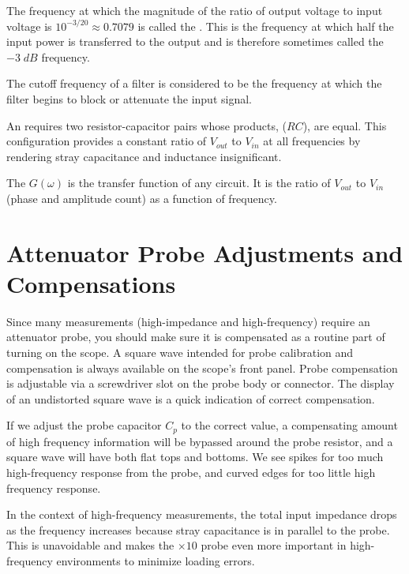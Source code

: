 \documentclass[12pt, a4paper, oneside, openright, titlepage]{book}
\begin{document}
\begin{defn}
    The frequency at which the magnitude of the ratio of output voltage to input voltage is $10^{-3/20}\approx 0.7079$ is called the . This is the frequency at which half the input power is transferred to the output and is therefore sometimes called the $-3\;dB$ frequency.
\end{defn}

The cutoff frequency of a filter is considered to be the frequency at which the filter begins to block or attenuate the input signal.

\begin{defn}
    An  requires two resistor-capacitor pairs whose products, ($RC$), are equal. This configuration provides a constant ratio of $V_{out}$ to $V_{in}$ at all frequencies by rendering stray capacitance and inductance insignificant.
\end{defn}

\begin{defn}
    The  $G(\omega)$ is the transfer function of any circuit. It is the ratio of $V_{out}$ to $V_{in}$ (phase and amplitude count) as a function of frequency.
\end{defn}

\section{Attenuator Probe Adjustments and Compensations}

Since many measurements (high-impedance and high-frequency) require an attenuator probe, you should make sure it is compensated as a routine part of turning on the scope. A square wave intended for probe calibration and compensation is always available on the scope's front panel. Probe compensation is adjustable via a screwdriver slot on the probe body or connector. The display of an undistorted square wave is a quick indication of correct compensation.

If we adjust the probe capacitor $C_p$ to the correct value, a compensating amount of high frequency information will be bypassed around the probe resistor, and a square wave will have both flat tops and bottoms. We see spikes for too much high-frequency response from the probe, and curved edges for too little high frequency response.

\begin{rmk}
    In the context of high-frequency measurements, the total input impedance drops as the frequency increases because stray capacitance is in parallel to the probe. This is unavoidable and makes the $\times 10$ probe even more important in high-frequency environments to minimize loading errors.
\end{rmk}
\end{document}
